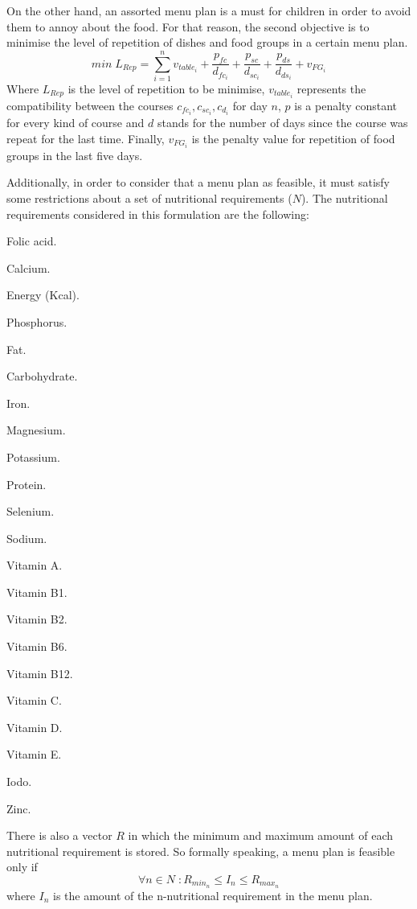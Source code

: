 On the other hand, an assorted menu plan is a must for children in order to avoid them to annoy about the food. For that reason, the second objective is to minimise the level of repetition of dishes and food groups in a certain menu plan. 
\[
    min\; L_{Rep} = \sum_{i=1}^{n}{v_{table_{i}} + \frac{p_{fc}}{d_{fc_{i}}} + \frac{p_{sc}}{d_{sc_{i}}} + \frac{p_{ds}}{d_{ds_{i}}} + v_{FG_{i}}}
\]
Where $L_{Rep}$ is the level of repetition to be minimise, $v_{table_{i}}$ represents the compatibility between the courses $c_{fc_{i}}, c_{sc_{i}}, c_{d_{i}}$ for day $n$, $p$ is a penalty constant for every kind of course and $d$ stands for the number of days since the course was repeat for the last time. Finally, $v_{FG_{i}}$ is the penalty value for repetition of food groups in the last five days.

Additionally, in order to consider that a menu plan as feasible, it must satisfy some restrictions about a set of nutritional requirements ($N$). The nutritional requirements considered in this formulation are the following:
\begin{AutoMultiColItemize}
    \item Folic acid.
    \item Calcium.
    \item Energy (Kcal).
    \item Phosphorus.
    \item Fat.
    \item Carbohydrate.
    \item Iron.
    \item Magnesium.
    \item Potassium.
    \item Protein.
    \item Selenium.
    \item Sodium.
    \item Vitamin A.
    \item Vitamin B1.
    \item Vitamin B2.
    \item Vitamin B6.
    \item Vitamin B12.
    \item Vitamin C.
    \item Vitamin D.
    \item Vitamin E.
    \item Iodo.
    \item Zinc.
\end{AutoMultiColItemize}
There is also a vector $R$ in which the minimum and maximum amount of each nutritional requirement is stored. So formally speaking, a menu plan is feasible only if
\[
    \forall	 n \in N\; : R_{min_{n}} \leq I_{n} \leq R_{max_{n}}
\]
where $I_{n}$ is the amount of the n-nutritional requirement in the menu plan.

